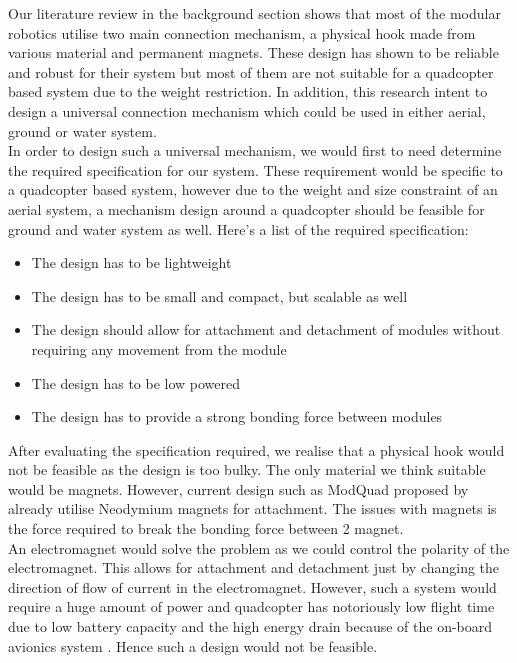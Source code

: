 \documentclass[12pt,A4]{article}
\begin{document}
	Our literature review in the background section shows that most of the modular robotics utilise two main connection mechanism, a physical hook made from various material and permanent magnets. These design has shown to be reliable and robust for their system but most of them are not suitable for a quadcopter based system due to the weight restriction. In addition, this research intent to design a universal connection mechanism which could be used in either aerial, ground or water system.\\
	
	In order to design such a universal mechanism, we would first to need determine the required specification for our system. These requirement would be specific to a quadcopter based system, however due to the weight and size constraint of an aerial system, a mechanism design around a quadcopter should be feasible for ground and water system as well. Here's a list of the required specification:
	
	\begin{itemize}
		\item The design has to be lightweight
		\item The design has to be small and compact, but scalable as well
		\item The design should allow for attachment and detachment of modules without requiring any movement from the module
		\item The design has to be low powered
		\item The design has to provide a strong bonding force between modules
	\end{itemize}
	
	After evaluating the specification required, we realise that a physical hook would not be feasible as the design is too bulky. The only material we think suitable would be magnets. However, current design such as ModQuad proposed by \citep{saldana2018modquad} already utilise Neodymium magnets for attachment. The issues with magnets is the force required to break the bonding force between 2 magnet. \\
	
	An electromagnet would solve the problem as we could control the polarity of the electromagnet. This allows for attachment and detachment just by changing the direction of flow of current in the electromagnet. However, such a system would require a huge amount of power and quadcopter has notoriously low flight time due to low battery capacity and the high energy drain because of the on-board avionics system \citep{lee2015autonomous}. Hence such a design would not be feasible.\\
	
\end{document}

